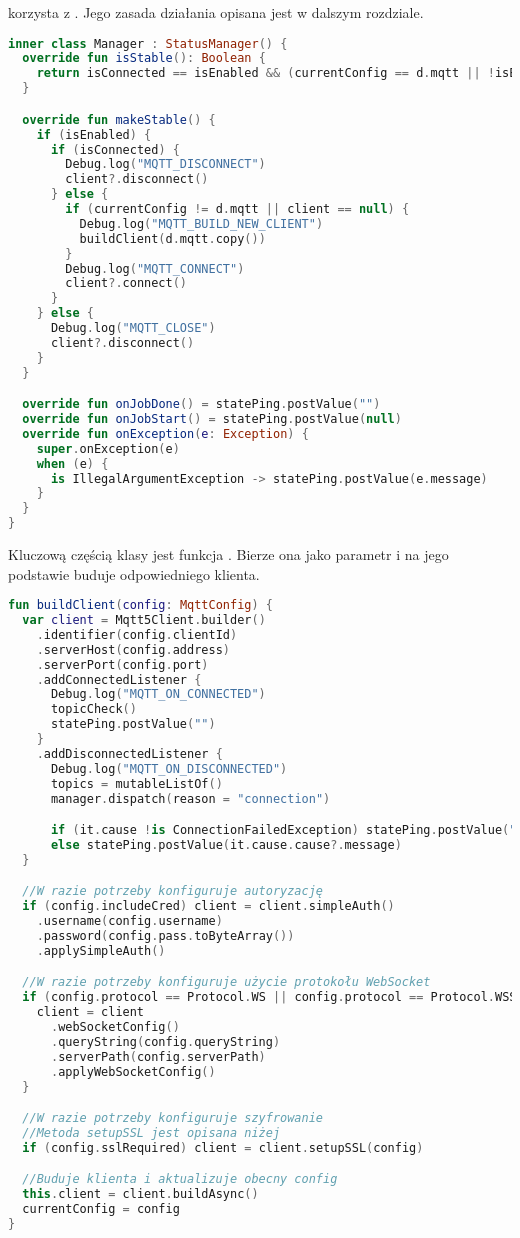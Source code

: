 \newpage

 korzysta z . Jego zasada działania opisana jest w dalszym rozdziale.

\begin{lstlisting}[language=Kotlin]
inner class Manager : StatusManager() {
  override fun isStable(): Boolean {
    return isConnected == isEnabled && (currentConfig == d.mqtt || !isEnabled)
  }

  override fun makeStable() {
    if (isEnabled) {
      if (isConnected) {
        Debug.log("MQTT_DISCONNECT")
        client?.disconnect()
      } else {
        if (currentConfig != d.mqtt || client == null) {
          Debug.log("MQTT_BUILD_NEW_CLIENT")
          buildClient(d.mqtt.copy())
        }
        Debug.log("MQTT_CONNECT")
        client?.connect()
      }
    } else {
      Debug.log("MQTT_CLOSE")
      client?.disconnect()
    }
  }

  override fun onJobDone() = statePing.postValue("")
  override fun onJobStart() = statePing.postValue(null)
  override fun onException(e: Exception) {
    super.onException(e)
    when (e) {
      is IllegalArgumentException -> statePing.postValue(e.message)
    }
  }
}
\end{lstlisting}

\newpage

Kluczową częścią klasy  jest funkcja . Bierze ona  jako parametr i na jego podstawie buduje odpowiedniego klienta.

\begin{lstlisting}[language=Kotlin]
fun buildClient(config: MqttConfig) {
  var client = Mqtt5Client.builder()
    .identifier(config.clientId)
    .serverHost(config.address)
    .serverPort(config.port)
    .addConnectedListener {
      Debug.log("MQTT_ON_CONNECTED")
      topicCheck()
      statePing.postValue("")
    }
    .addDisconnectedListener {
      Debug.log("MQTT_ON_DISCONNECTED")
      topics = mutableListOf()
      manager.dispatch(reason = "connection")

      if (it.cause !is ConnectionFailedException) statePing.postValue("")
      else statePing.postValue(it.cause.cause?.message)
  }

  //W razie potrzeby konfiguruje autoryzację
  if (config.includeCred) client = client.simpleAuth()
    .username(config.username)
    .password(config.pass.toByteArray())
    .applySimpleAuth()

  //W razie potrzeby konfiguruje użycie protokołu WebSocket
  if (config.protocol == Protocol.WS || config.protocol == Protocol.WSS) {
    client = client
      .webSocketConfig()
      .queryString(config.queryString)
      .serverPath(config.serverPath)
      .applyWebSocketConfig()
  }

  //W razie potrzeby konfiguruje szyfrowanie
  //Metoda setupSSL jest opisana niżej
  if (config.sslRequired) client = client.setupSSL(config)

  //Buduje klienta i aktualizuje obecny config
  this.client = client.buildAsync()
  currentConfig = config
}
\end{lstlisting}

